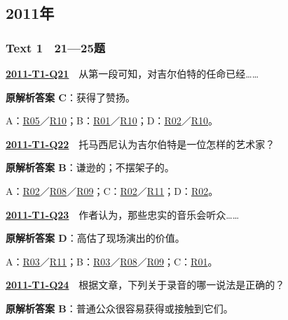 \documentclass[11pt,a4paper]{article}
\begin{document}
\subsection{2011年}\label{year-2011}
\subsubsection{Text 1　21—25题}
\label{idx-2011-T1-Q21}\noindent\textbf{\href{https://zj139.github.io/math-notes/english/9de80db7356ff635cec8a286/\#q21}{2011-T1-Q21}}　从第一段可知，对吉尔伯特的任命已经……\par\nopagebreak
\noindent\textbf{原解析答案 C}：获得了赞扬。\par\nopagebreak
\noindent A：\hyperref[cat-R05]{R05}／\hyperref[cat-R10]{R10}；B：\hyperref[cat-R01]{R01}／\hyperref[cat-R10]{R10}；D：\hyperref[cat-R02]{R02}／\hyperref[cat-R10]{R10}。\par\smallskip
{}\label{idx-2011-T1-Q22}\noindent\textbf{\href{https://zj139.github.io/math-notes/english/9de80db7356ff635cec8a286/\#q22}{2011-T1-Q22}}　托马西尼认为吉尔伯特是一位怎样的艺术家？\par\nopagebreak
\noindent\textbf{原解析答案 B}：谦逊的；不摆架子的。\par\nopagebreak
\noindent A：\hyperref[cat-R02]{R02}／\hyperref[cat-R08]{R08}／\hyperref[cat-R09]{R09}；C：\hyperref[cat-R02]{R02}／\hyperref[cat-R11]{R11}；D：\hyperref[cat-R02]{R02}。\par\smallskip
{}\label{idx-2011-T1-Q23}\noindent\textbf{\href{https://zj139.github.io/math-notes/english/9de80db7356ff635cec8a286/\#q23}{2011-T1-Q23}}　作者认为，那些忠实的音乐会听众……\par\nopagebreak
\noindent\textbf{原解析答案 D}：高估了现场演出的价值。\par\nopagebreak
\noindent A：\hyperref[cat-R03]{R03}／\hyperref[cat-R11]{R11}；B：\hyperref[cat-R03]{R03}／\hyperref[cat-R08]{R08}／\hyperref[cat-R09]{R09}；C：\hyperref[cat-R01]{R01}。\par\smallskip
{}\label{idx-2011-T1-Q24}\noindent\textbf{\href{https://zj139.github.io/math-notes/english/9de80db7356ff635cec8a286/\#q24}{2011-T1-Q24}}　根据文章，下列关于录音的哪一说法是正确的？\par\nopagebreak
\noindent\textbf{原解析答案 B}：普通公众很容易获得或接触到它们。\par\nopagebreak
\end{document}
